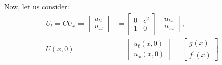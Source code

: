 \begin{enumerate}
  Now, let us consider:
  \begin{align}
    U_t = CU_x \Rightarrow
    \begin{bmatrix}
      u_{tt}\\
      u_{xt}
    \end{bmatrix}
    & =
    \begin{bmatrix}
      0 & c^2\\
      1 & 0
    \end{bmatrix}
    \begin{bmatrix}
      u_{tx}\\
      u_{xx}
    \end{bmatrix},\\
    U(x, 0) & =
    \begin{bmatrix}
      u_t(x, 0)\\
      u_x(x, 0)
    \end{bmatrix}
    =
    \begin{bmatrix}
      g(x)\\
      f^\prime(x)
    \end{bmatrix}
  \end{align}
\end{enumerate}
